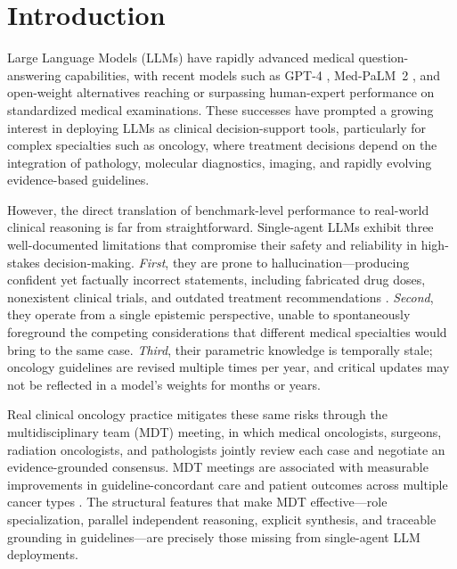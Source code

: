 \documentclass[final, 11pt, 3p]{elsarticle}
\begin{document}

\section{Introduction}
\label{sec:intro}

Large Language Models (LLMs) have rapidly advanced medical
question-answering capabilities, with recent models such as GPT-4
\cite{Nori2023}, Med-PaLM~2 \cite{Singhal2023}, and open-weight
alternatives reaching or surpassing human-expert performance on
standardized medical examinations. These successes have prompted a
growing interest in deploying LLMs as clinical decision-support tools,
particularly for complex specialties such as oncology, where treatment
decisions depend on the integration of pathology, molecular diagnostics,
imaging, and rapidly evolving evidence-based guidelines.

However, the direct translation of benchmark-level performance to
real-world clinical reasoning is far from straightforward. Single-agent
LLMs exhibit three well-documented limitations that compromise their
safety and reliability in high-stakes decision-making. \emph{First},
they are prone to hallucination---producing confident yet factually
incorrect statements, including fabricated drug doses, nonexistent
clinical trials, and outdated treatment recommendations
\cite{Ji2023,Omiye2023}. \emph{Second}, they operate from a single
epistemic perspective, unable to spontaneously foreground the competing
considerations that different medical specialties would bring to the
same case. \emph{Third}, their parametric knowledge is temporally stale;
oncology guidelines are revised multiple times per year, and critical
updates may not be reflected in a model's weights for months or years.

Real clinical oncology practice mitigates these same risks through the
multidisciplinary team (MDT) meeting, in which medical oncologists,
surgeons, radiation oncologists, and pathologists jointly review each
case and negotiate an evidence-grounded consensus. MDT meetings are
associated with measurable improvements in guideline-concordant care
and patient outcomes across multiple cancer types
\cite{Pillay2016,Prades2015,Winters2021}. The
structural features that make MDT effective---role specialization,
parallel independent reasoning, explicit synthesis, and traceable
grounding in guidelines---are precisely those missing from single-agent
LLM deployments.
\end{document}
